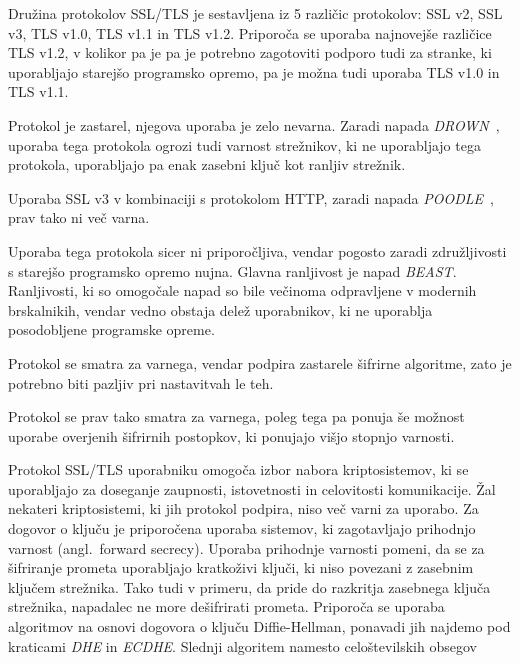 \documentclass[12pt,a4paper,openany,tikz]{book}
\theoremstyle{plain}
\theoremstyle{definition}
\begin{document}
Družina protokolov SSL/TLS je sestavljena iz 5 različic protokolov: SSL v2, SSL v3, TLS v1.0, TLS v1.1 in TLS v1.2. Priporoča se uporaba najnovejše različice TLS v1.2, v kolikor pa je pa je potrebno zagotoviti podporo tudi za stranke, ki uporabljajo starejšo programsko opremo, pa je možna tudi uporaba TLS v1.0 in TLS v1.1.

\begin{description}[style=nextline]
  \item[SSL v2] Protokol je zastarel, njegova uporaba je zelo nevarna. Zaradi napada \textit{DROWN}~\cite{aviramdrown}, uporaba tega protokola ogrozi tudi varnost strežnikov, ki ne uporabljajo tega protokola, uporabljajo pa enak zasebni ključ kot ranljiv strežnik.
  \item[SSL v3] Uporaba SSL v3 v kombinaciji s protokolom HTTP, zaradi napada \textit{POODLE}~\cite{moller2014poodle}, prav tako ni več varna.
  \item[TLS v1.0] Uporaba tega protokola sicer ni priporočljiva, vendar pogosto zaradi združljivosti s starejšo programsko opremo nujna. Glavna ranljivost je napad \textit{BEAST}. Ranljivosti, ki so omogočale napad so bile večinoma odpravljene v modernih brskalnikih, vendar vedno obstaja delež uporabnikov, ki ne uporablja posodobljene programske opreme.
  \item[TLS v1.1] Protokol se smatra za varnega, vendar podpira zastarele šifrirne algoritme, zato je potrebno biti pazljiv pri nastavitvah le teh.
  \item[TLS v1.2] Protokol se prav tako smatra za varnega, poleg tega pa ponuja še možnost uporabe overjenih šifrirnih postopkov, ki ponujajo višjo stopnjo varnosti.
\end{description}

Protokol SSL/TLS uporabniku omogoča izbor nabora kriptosistemov, ki se uporabljajo za doseganje zaupnosti, istovetnosti in celovitosti komunikacije. Žal nekateri kriptosistemi, ki jih protokol podpira, niso več varni za uporabo. Za dogovor o ključu je priporočena uporaba sistemov, ki zagotavljajo prihodnjo varnost (angl.\ forward secrecy). Uporaba prihodnje varnosti pomeni, da se za šifriranje prometa uporabljajo kratkoživi ključi, ki niso povezani z zasebnim ključem strežnika. Tako tudi v primeru, da pride do razkritja zasebnega ključa strežnika, napadalec ne more dešifrirati prometa. Priporoča se uporaba algoritmov na osnovi dogovora o ključu Diffie-Hellman, ponavadi jih najdemo pod kraticami \textit{DHE} in \textit{ECDHE}. Slednji algoritem namesto celoštevilskih obsegov
\end{document}
